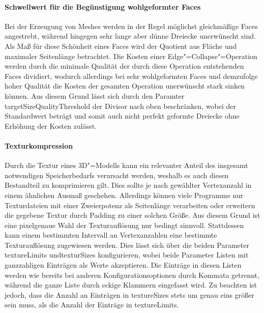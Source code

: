 \paragraph{Schwellwert für die Begünstigung wohlgeformter Faces} Bei der Erzeugung von Meshes werden in der Regel möglichst gleichmäßige Faces angestrebt, während hingegen sehr lange aber dünne Dreiecke unerwünscht sind. Als Maß für diese \glqq{}Schönheit\grqq{} eines Faces wird der Quotient aus Fläche und maximaler Seitenlänge betrachtet. Die Kosten einer Edge"=Collapse"=Operation werden durch die minimale Qualität der durch diese Operation entstehenden Faces dividiert, wodurch allerdings bei sehr wohlgeformten Faces und demzufolge hoher Qualität die Kosten der gesamten Operation unerwünscht stark sinken können. Aus diesem Grund lässt sich durch den Paramter {\ttfamily target\-Size\-Quality\-Threshold} der Divisor nach oben beschränken, wobei der Standardwert {} beträgt und somit auch nicht perfekt geformte Dreiecke ohne Erhöhung der Kosten zulässt.

\paragraph{Texturkompression} Durch die Textur eines 3D"=Modells kann ein relevanter Anteil des insgesamt notwendigen Speicherbedarfs verursacht werden, weshalb es auch diesen Bestandteil zu komprimieren gilt. Dies sollte je nach gewählter Vertexanzahl in einem ähnlichen Ausmaß geschehen. Allerdings können viele Programme nur Texturdateien mit einer Zweierpotenz als Seitenlänge verarbeiten oder erweitern die gegebene Textur durch Padding zu einer solchen Größe. Aus diesem Grund ist eine pixelgenaue Wahl der Texturauflösung nur bedingt sinnvoll. Stattdessen kann einem bestimmten Intervall an Vertexanzahlen eine bestimmte Texturauflösung zugewiesen werden. Dies lässt sich über die beiden Parameter {\ttfamily texture\-Limits} und{\ttfamily textur\-Sizes} konfigurieren, wobei beide Parameter Listen mit ganzzahligen Einträgen als Werte akzeptieren. Die Einträge in diesen Listen werden wie bereits bei anderen Konfigurationsoptionen durch Kommata getrennt, während die ganze Liste durch eckige Klammern eingefasst wird. Zu beachten ist jedoch, dass die Anzahl an Einträgen in {\ttfamily texture\-Sizes} stets um genau eins größer sein muss, als die Anzahl der Einträge in {\ttfamily texture\-Limits}. 

